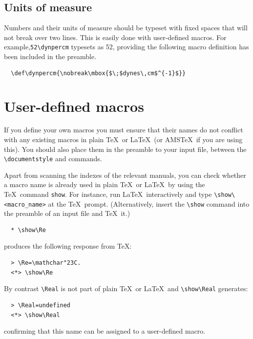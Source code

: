 \subsection{Units of measure}
Numbers and their units of measure should be typeset with fixed spaces
that will not break over two lines. This is easily done with user-defined
macros. For example,\linebreak \verb"52\dynpercm" typesets as
52\dynpercm , providing the following macro definition has been included
in the preamble.

\smallskip
\begin{verbatim}
  \def\dynpercm{\nobreak\mbox{$\;$dynes\,cm$^{-1}$}}
\end{verbatim}

\section{User-defined macros}\label{secUser}
If you define your own macros you must ensure that their names do not
conflict with any existing macros in plain \TeX\ or \LaTeX\ (or AMS\TeX\ 
if you are using this). You should also place them in the preamble to
your input file, between the \verb"\documentstyle" and
\verb"" commands.

Apart from scanning the indexes of the relevant manuals, you can check
whether a macro name is already used in plain \TeX\ or \LaTeX\ by using
the \TeX\ command \verb"show". For instance, run \LaTeX\ interactively
and type \verb"\show\<macro_name>" at the \TeX\ prompt. (Alternatively,
insert the \verb"\show" command into the preamble of an input file and
\TeX\ it.)

\smallskip
\begin{verbatim}
  * \show\Re
\end{verbatim}
\smallskip

\noindent produces the following response from \TeX :

\smallskip
\begin{verbatim}
  > \Re=\mathchar"23C.
  <*> \show\Re
\end{verbatim}
\smallskip

\noindent By contrast \verb"\Real" is not part of plain \TeX\ or \LaTeX\ and
\verb"\show\Real" generates:

\smallskip
\begin{verbatim}
  > \Real=undefined
  <*> \show\Real
\end{verbatim}
\smallskip

\noindent confirming that this name can be assigned to a user-defined macro.

